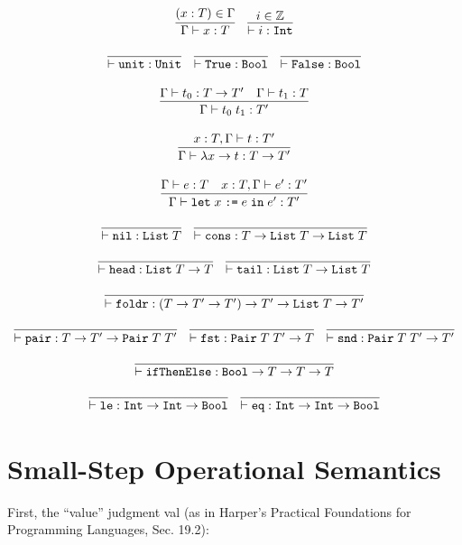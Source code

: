 \documentclass[10pt]{article}
\newcommand{\ttt}[1]{\texttt{#1}}
\newcommand{\ra}{\ensuremath{\rightarrow}}
\newcommand{\Int}{\ttt{Int}}
\newcommand{\Bool}{\ttt{Bool}}
\newcommand{\tyPair}{\ttt{Pair}}
\newcommand{\List}{\ttt{List}}
\newcommand{\letbnd}{\ttt{let}}
\newcommand{\inexpr}{\ttt{in}}
\begin{document}
\[
  \begin{array}{cc}
    \infer{\Gamma \vdash x : T}{(x : T) \in \Gamma}
    ~~~
    \infer{\vdash i : \ttt{Int}}{i \in \mathbb{Z}}
    \\\\
    \infer{\vdash \ttt{unit} : \ttt{Unit}}{}
    ~~~
    \infer{\vdash \ttt{True} : \ttt{Bool}}{}
    ~~~
    \infer{\vdash \ttt{False} : \ttt{Bool}}{}
    \\\\
    \infer{\Gamma \vdash t_0\; t_1 : T'}{\Gamma \vdash t_0 : T \ra T' & \Gamma \vdash t_1 : T}
    \\\\
    \infer{\Gamma \vdash \lambda x \ra t : T \ra T'}{x : T, \Gamma \vdash t : T'}
    \\\\
    \infer{\Gamma \vdash \letbnd\; x\; \ttt{:=}\; e\; \inexpr\; e' : T'}{\Gamma \vdash e : T & x : T, \Gamma \vdash e' : T'}
    \\\\
    \infer{\vdash \ttt{nil} : \List\; T}{}
    ~~~
    \infer{\vdash \ttt{cons} : T \ra \List\; T \ra \List\; T}{}
    \\\\
    \infer{\vdash \ttt{head} : \List\; T \ra T}{}
    ~~~
    \infer{\vdash \ttt{tail} : \List\; T \ra \List\; T}{}
    \\\\
    \infer{\vdash \ttt{foldr} : (T \ra T' \ra T') \ra T' \ra \List\; T \ra T'}{}
    \\\\
    \infer{\vdash \ttt{pair} : T \ra T' \ra \tyPair\; T\; T'}{}
    ~~~
    \infer{\vdash \ttt{fst} : \tyPair\; T\; T' \ra T}{}
    ~~~
    \infer{\vdash \ttt{snd} : \tyPair\; T\; T' \ra T'}{}
    \\\\
    \infer{\vdash \ttt{ifThenElse} : \Bool \ra T \ra T \ra T}{}
    \\\\
    \infer{\vdash \ttt{le} : \Int \ra \Int \ra \Bool}{}
    ~~~
    \infer{\vdash \ttt{eq} : \Int \ra \Int \ra \Bool}{}
  \end{array}
\]

\section{Small-Step Operational Semantics}

First, the ``value'' judgment val (as in Harper's Practical Foundations for Programming Languages, Sec. 19.2):
\end{document}
